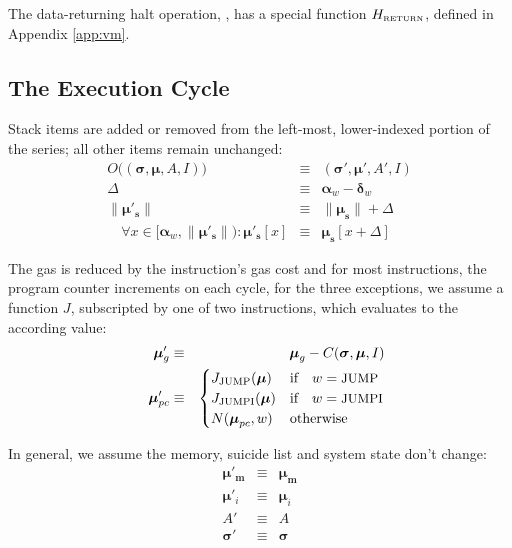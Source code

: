\documentclass[9pt,oneside]{amsart}
\begin{document}
\begin{multicols}{2}
The data-returning halt operation, , has a special function $H_{\text{\tiny RETURN}}$, defined in Appendix \ref{app:vm}.

\subsection{The Execution Cycle}

Stack items are added or removed from the left-most, lower-indexed portion of the series; all other items remain unchanged:
\begin{eqnarray}
O\big((\boldsymbol{\sigma}, \boldsymbol{\mu}, A, I)\big) & \equiv & (\boldsymbol{\sigma}', \boldsymbol{\mu}', A', I) \\
\Delta & \equiv & \mathbf{\alpha}_w - \mathbf{\delta}_w \\
\lVert\boldsymbol{\mu}'_\mathbf{s}\rVert & \equiv & \lVert\boldsymbol{\mu}_\mathbf{s}\rVert + \Delta \\
\quad \forall x \in [\mathbf{\alpha}_w, \lVert\boldsymbol{\mu}'_\mathbf{s}\rVert): \boldsymbol{\mu}'_\mathbf{s}[x] & \equiv & \boldsymbol{\mu}_\mathbf{s}[x+\Delta]
\end{eqnarray}

The gas is reduced by the instruction's gas cost and for most instructions, the program counter increments on each cycle, for the three exceptions, we assume a function $J$, subscripted by one of two instructions, which evaluates to the according value:
\begin{eqnarray}
\quad \boldsymbol{\mu}'_{g} & \equiv & \boldsymbol{\mu}_{g} - C(\boldsymbol{\sigma}, \boldsymbol{\mu}, I) \\
\quad \boldsymbol{\mu}'_{pc} & \equiv & \begin{cases}
J_{\text{JUMP}}(\boldsymbol{\mu}) & \text{if} \quad w = \text{\small JUMP} \\
J_{\text{JUMPI}}(\boldsymbol{\mu}) & \text{if} \quad w = \text{\small JUMPI} \\
N(\boldsymbol{\mu}_{pc}, w) & \text{otherwise}
\end{cases}
\end{eqnarray}

In general, we assume the memory, suicide list and system state don't change:
\begin{eqnarray}
\boldsymbol{\mu}'_\mathbf{m} & \equiv & \boldsymbol{\mu}_\mathbf{m} \\
\boldsymbol{\mu}'_i & \equiv & \boldsymbol{\mu}_i \\
A' & \equiv & A \\
\boldsymbol{\sigma}' & \equiv & \boldsymbol{\sigma}
\end{eqnarray}


\end{multicols}
\end{document}
